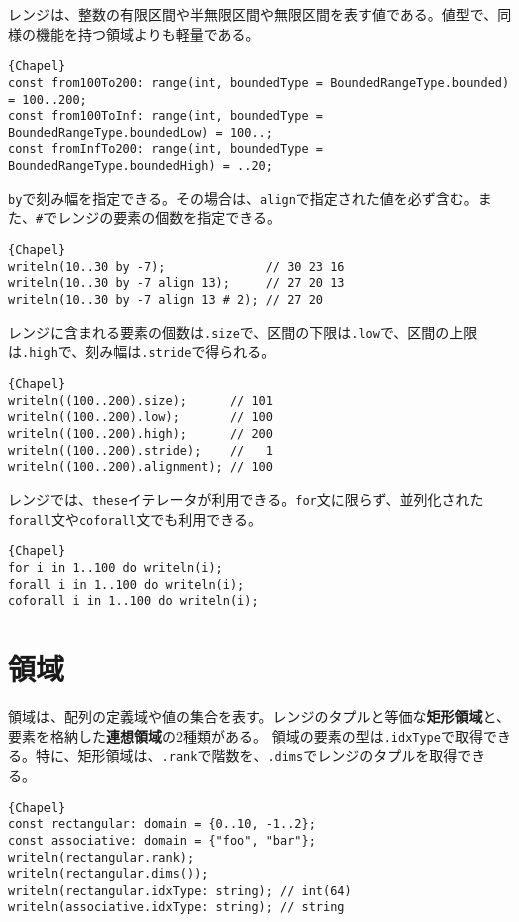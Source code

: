 \documentclass[10pt,a4paper]{book}
\begin{document}
レンジは、整数の有限区間や半無限区間や無限区間を表す値である。値型で、同様の機能を持つ領域よりも軽量である。

\begin{Verbatim}{Chapel}
const from100To200: range(int, boundedType = BoundedRangeType.bounded) = 100..200;
const from100ToInf: range(int, boundedType = BoundedRangeType.boundedLow) = 100..;
const fromInfTo200: range(int, boundedType = BoundedRangeType.boundedHigh) = ..20;
\end{Verbatim}

\texttt{by}で刻み幅を指定できる。その場合は、\texttt{align}で指定された値を必ず含む。また、\verb|#|でレンジの要素の個数を指定できる。

\begin{Verbatim}{Chapel}
writeln(10..30 by -7);              // 30 23 16
writeln(10..30 by -7 align 13);     // 27 20 13
writeln(10..30 by -7 align 13 # 2); // 27 20
\end{Verbatim}

レンジに含まれる要素の個数は\texttt{.size}で、区間の下限は\texttt{.low}で、区間の上限は\texttt{.high}で、刻み幅は\texttt{.stride}で得られる。

\begin{Verbatim}{Chapel}
writeln((100..200).size);      // 101
writeln((100..200).low);       // 100
writeln((100..200).high);      // 200
writeln((100..200).stride);    //   1
writeln((100..200).alignment); // 100
\end{Verbatim}

レンジでは、\texttt{these}イテレータが利用できる。\texttt{for}文に限らず、並列化された\texttt{forall}文や\texttt{coforall}文でも利用できる。

\begin{Verbatim}{Chapel}
for i in 1..100 do writeln(i);
forall i in 1..100 do writeln(i);
coforall i in 1..100 do writeln(i);
\end{Verbatim}

\section{領域}

領域は、配列の定義域や値の集合を表す。レンジのタプルと等価な\textbf{矩形領域}と、要素を格納した\textbf{連想領域}の2種類がある。
領域の要素の型は\texttt{.idxType}で取得できる。特に、矩形領域は、\texttt{.rank}で階数を、\texttt{.dims}でレンジのタプルを取得できる。

\begin{Verbatim}{Chapel}
const rectangular: domain = {0..10, -1..2};
const associative: domain = {"foo", "bar"};
writeln(rectangular.rank);
writeln(rectangular.dims());
writeln(rectangular.idxType: string); // int(64)
writeln(associative.idxType: string); // string
\end{Verbatim}
\end{document}
